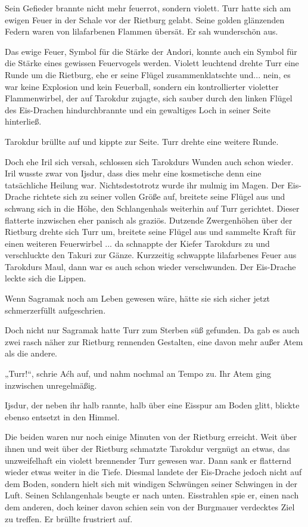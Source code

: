 Sein Gefieder brannte nicht mehr feuerrot, sondern violett. Turr hatte sich am ewigen Feuer in der Schale vor der Rietburg gelabt. Seine golden glänzenden Federn waren von lilafarbenen Flammen übersät. Er sah wunderschön aus.

Das ewige Feuer, Symbol für die Stärke der Andori, konnte auch ein Symbol für die Stärke eines gewissen Feuervogels werden. Violett leuchtend drehte Turr eine Runde um die Rietburg, ehe er seine Flügel zusammenklatschte und... nein, es war keine Explosion und kein Feuerball, sondern ein kontrollierter violetter Flammenwirbel, der auf Tarokdur zujagte, sich sauber durch den linken Flügel des Eis-Drachen hindurchbrannte und ein gewaltiges Loch in seiner Seite hinterließ.

Tarokdur brüllte auf und kippte zur Seite. Turr drehte eine weitere Runde.

Doch ehe Iril sich versah, schlossen sich Tarokdurs Wunden auch schon wieder. Iril wusste zwar von Ijsdur, dass dies mehr eine kosmetische denn eine tatsächliche Heilung war. Nichtsdestotrotz wurde ihr mulmig im Magen. Der Eis-Drache richtete sich zu seiner vollen Größe auf, breitete seine Flügel aus und schwang sich in die Höhe, den Schlangenhals weiterhin auf Turr gerichtet. Dieser flatterte inzwischen eher panisch als graziös. Dutzende Zwergenhöhen über der Rietburg drehte sich Turr um, breitete seine Flügel aus und sammelte Kraft für einen weiteren Feuerwirbel ... da schnappte der Kiefer Tarokdurs zu und verschluckte den Takuri zur Gänze. Kurzzeitig schwappte lilafarbenes Feuer aus Tarokdurs Maul, dann war es auch schon wieder verschwunden. Der Eis-Drache leckte sich die Lippen.

Wenn Sagramak noch am Leben gewesen wäre, hätte sie sich sicher jetzt schmerzerfüllt aufgeschrien.

Doch nicht nur Sagramak hatte Turr zum Sterben süß gefunden. Da gab es auch zwei rasch näher zur Rietburg rennenden Gestalten, eine davon mehr außer Atem als die andere.\bigskip







„Turr!“, schrie Aćh auf, und nahm nochmal an Tempo zu. Ihr Atem ging inzwischen unregelmäßig.

Ijsdur, der neben ihr halb rannte, halb über eine Eisspur am Boden glitt, blickte ebenso entsetzt in den Himmel.

Die beiden waren nur noch einige Minuten von der Rietburg erreicht. Weit über ihnen und weit über der Rietburg schmatzte Tarokdur vergnügt an etwas, das unzweifelhaft ein violett brennender Turr gewesen war. Dann sank er flatternd wieder etwas weiter in die Tiefe. Diesmal landete der Eis-Drache jedoch nicht auf dem Boden, sondern hielt sich mit windigen Schwüngen seiner Schwingen in der Luft. Seinen Schlangenhals beugte er nach unten. Eisstrahlen spie er, einen nach dem anderen, doch keiner davon schien sein von der Burgmauer verdecktes Ziel zu treffen. Er brüllte frustriert auf.

